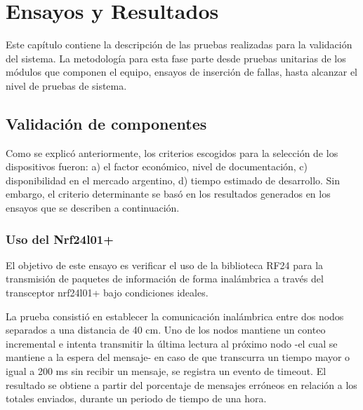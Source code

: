 
\chapter{Ensayos y Resultados} %

\label{Chapter4} %


Este capítulo contiene la  descripción de  las pruebas realizadas para la validación del sistema. La metodología para esta fase parte desde pruebas unitarias de los módulos que componen el equipo, ensayos de inserción de fallas, hasta alcanzar el nivel de pruebas de sistema.

\section{Validación de componentes}
\label{sec:validacion_componentes}

Como se explicó anteriormente, los criterios escogidos para la selección de los dispositivos fueron: a) el factor económico, nivel de documentación,  c) disponibilidad en el mercado argentino, d) tiempo estimado de desarrollo. Sin embargo, el criterio determinante se basó en los resultados generados en los ensayos que se describen a continuación.

\subsection{Uso del Nrf24l01+}

El objetivo de este ensayo es verificar el uso de la biblioteca RF24 para la transmisión de paquetes de información de forma inalámbrica a través del transceptor nrf24l01+ bajo condiciones ideales.

La prueba consistió  en establecer la comunicación inalámbrica entre dos nodos separados a una distancia de 40 cm. Uno de los nodos mantiene un conteo incremental e intenta transmitir la última lectura al próximo nodo -el cual se mantiene a la espera del mensaje- en caso de que transcurra un tiempo mayor o igual a 200 ms sin recibir un mensaje, se registra un evento de timeout. El resultado se obtiene a partir del porcentaje de mensajes erróneos en relación a los totales enviados, durante un periodo de tiempo de una hora.

